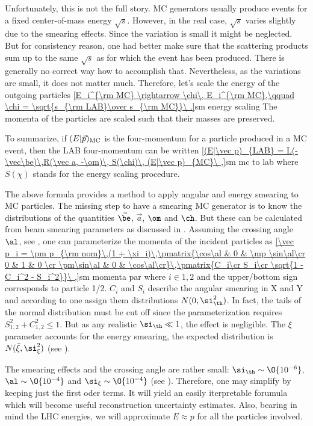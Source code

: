 Unfortunately, this is not the full story. MC generators usually produce events for a fixed center-of-mass energy $\sqrt{s}$. However, in the real case, $\sqrt{s}$ varies slightly due to the smearing effects. Since the variation is small it might be neglected. But for consistency reason, one had better make sure that the scattering products sum up to the same $\sqrt{s}$ as for which the event has been produced. There is generally no correct way how to accomplish that. Nevertheless, as the variations are small, it does not matter much. Therefore, let's scale the energy of the outgoing particles
\eqref{E_i^{\rm MC} \rightarrow \chi\, E_i^{\rm MC},\qquad \chi = \sqrt{s_{\rm LAB}\over s_{\rm MC}}\ .}{sm energy scaling}
The momenta of the particles are scaled such that their masses are preserved.

To summarize, if $(E|\vec p)_{\rm MC}$ is the four-momentum for a particle produced in a MC event, then the LAB four-momentum can be written
\eqref{(E|\vec p)_{LAB} = L(-\vec\be)\,R(\vec a, -\om)\, S(\chi)\, (E|\vec p)_{MC}\ ,}{sm mc to lab}
where $S(\chi)$ stands for the energy scaling procedure.



The above formula provides a method to apply angular and energy smearing to MC particles. The missing step to have a smearing MC generator is to know the distributions of the quantities $\vec\be$, $\vec a$, $\om$ and $\ch$. But these can be calculated from beam smearing parameters as discussed in . Assuming the crossing angle $\al$, see , one can parameterize the momenta of the incident particles as
\eqref{\vec p_i = \pm p_{\rm nom}\,(1 + \xi_i)\,\pmatrix{\cos\al & 0 & \mp \sin\al\cr 0 & 1 & 0 \cr \pm\sin\al & 0 & \cos\al\cr}\,\pmatrix{C_i\cr S_i\cr \sqrt{1 - C_i^2 - S_i^2}}\ ,}{sm momenta par}
where $i\in {1, 2}$ and the upper/bottom sign corresponds to particle 1/2. $C_i$ and $S_i$ describe the angular smearing in X and Y and according to  one assign them distributions $N(0, \si_\th^2)$. In fact, the tails of the normal distribution must be cut off since the parameterization requires $S_{1,2}^2 + C_{1,2}^2 \leq 1$. But as any realistic $\si_\th \ll 1$, the effect is negligible. The $\xi$ parameter accounts for the energy smearing, the expected distribution is $N(\bar\xi, \si_\xi^2)$ (see ).

The smearing effects and the crossing angle are rather small: $\si_\th \sim \O{10^{-6}}$, $\al \sim \O{10^{-4}}$ and $\si_\xi \sim \O{10^{-4}}$ (see  ). Therefore, one may simplify  by keeping just the first oder terms. It will yield an easily iterpretable forumula which will become useful reconstruction uncertainty estimates. Also, bearing in mind the LHC energies, we will approximate $E\approx p$ for all the particles involved.


